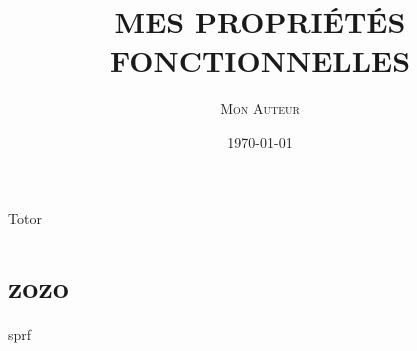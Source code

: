 \documentclass{article}
\title{\MakeUppercase{\textsc{Mes Propriétés Fonctionnelles}}}
\author{\textsc{Mon Auteur}}
\date{\today}
\begin{document}
\maketitle

Totor

\section{zozo}
sprf

\eire
\end{document}
